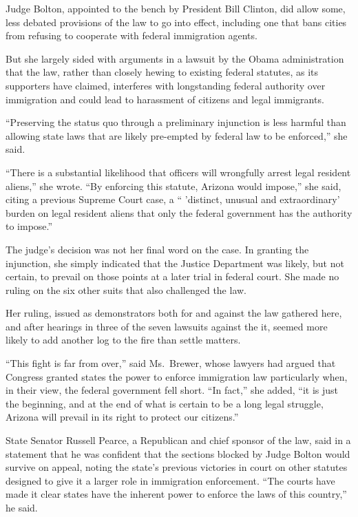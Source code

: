 ﻿\documentclass[12pt]{article}
\begin{document}
Judge Bolton, appointed to the bench by President Bill Clinton, did allow some, less debated
provisions of the law to go into effect, including one that bans cities from refusing to cooperate
with federal immigration agents.

But she largely sided with arguments in a lawsuit by the Obama administration that the law, rather
than closely hewing to existing federal statutes, as its supporters have claimed, interferes with
longstanding federal authority over immigration and could lead to harassment of citizens and legal
immigrants.

``Preserving the status quo through a preliminary injunction is less harmful than allowing state
laws that are likely pre-empted by federal law to be enforced,'' she said.

``There is a substantial likelihood that officers will wrongfully arrest legal resident aliens,''
she wrote. ``By enforcing this statute, Arizona would impose,'' she said, citing a previous Supreme
Court case, a `` 'distinct, unusual and extraordinary' burden on legal resident aliens that only the
federal government has the authority to impose.''

The judge's decision was not her final word on the case. In granting the injunction, she simply
indicated that the Justice Department was likely, but not certain, to prevail on those points at a
later trial in federal court. She made no ruling on the six other suits that also challenged the
law.

Her ruling, issued as demonstrators both for and against the law gathered here, and after hearings
in three of the seven lawsuits against the it, seemed more likely to add another log to the fire
than settle matters.

``This fight is far from over,'' said Ms.~Brewer, whose lawyers had argued that Congress granted
states the power to enforce immigration law particularly when, in their view, the federal government
fell short. ``In fact,'' she added, ``it is just the beginning, and at the end of what is certain to
be a long legal struggle, Arizona will prevail in its right to protect our citizens.''

State Senator Russell Pearce, a Republican and chief sponsor of the law, said in a statement that he
was confident that the sections blocked by Judge Bolton would survive on appeal, noting the state's
previous victories in court on other statutes designed to give it a larger role in immigration
enforcement. ``The courts have made it clear states have the inherent power to enforce the laws of
this country,'' he said.
\end{document}
